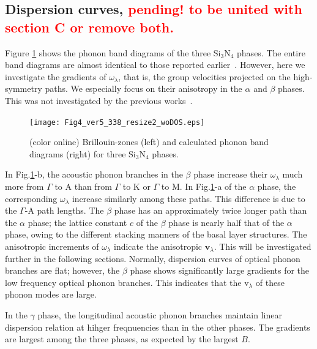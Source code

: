 \documentclass[twocolumn,amsmath,amssymb,a4paper,prb,superscriptaddress,floatfix]{revtex4-1}
\begin{document}
\subsection{Dispersion curves, \textcolor{red}{pending! to be united with section C or remove both.}}

Figure \ref{fig:Fig4_ver5_338} shows the phonon band diagrams of the three
Si$_3$N$_4$ phases. The entire band diagrams are almost identical to those
reported earlier~\cite{kuwabara,xu}. However, here we investigate the gradients
of $\omega_\lambda$, that is, the group velocities projected on the
high-symmetry paths. We especially focus on their anisotropy in the $\alpha$ and
$\beta$ phases. This was not investigated by the previous works~\cite{kuwabara,xu}.

\begin{figure}[ht]
	 \begin{center}
		   \texttt{[image: Fig4\_ver5\_338\_resize2\_woDOS.eps]}
		     \caption{(color online) Brillouin-zones (left) and calculated phonon band diagrams (right) for three Si$_3$N$_4$ phases.
		   \label{fig:Fig4_ver5_338} }
    \end{center}
\end{figure}

In Fig.\ref{fig:Fig4_ver5_338}-b, the acoustic phonon branches in the $\beta$
phase increase their $\omega_\lambda$ much more from $\Gamma$ to A than from
$\Gamma$ to K or $\Gamma$ to M. In Fig.\ref{fig:Fig4_ver5_338}-a of the
$\alpha$ phase, the corresponding $\omega_\lambda$ increase similarly among
these paths.  This difference is due to the $\Gamma$-A path lengths.  The
$\beta$ phase has an approximately twice longer path than the $\alpha$ phase;
the lattice constant $c$ of the $\beta$ phase is nearly half that of the
$\alpha$ phase, owing to the different stacking manners of the basal layer
structures.  The anisotropic increments of $\omega_\lambda$ indicate the
anisotropic $\mathbf{v}_\lambda$.  This will be investigated further in the
following sections.  Normally, dispersion curves of optical phonon branches are
flat; however, the $\beta$ phase shows significantly large gradients for the
low frequency optical phonon branches.  This indicates that the
\rm{v}$_{\lambda}$ of these phonon modes are large.

In the $\gamma$ phase, the longitudinal acoustic phonon branches maintain linear
dispersion relation at hihger freqnuencies than in the other phases.  The
gradients are largest among the three phases, as expected by the largest $B$.
\end{document}
